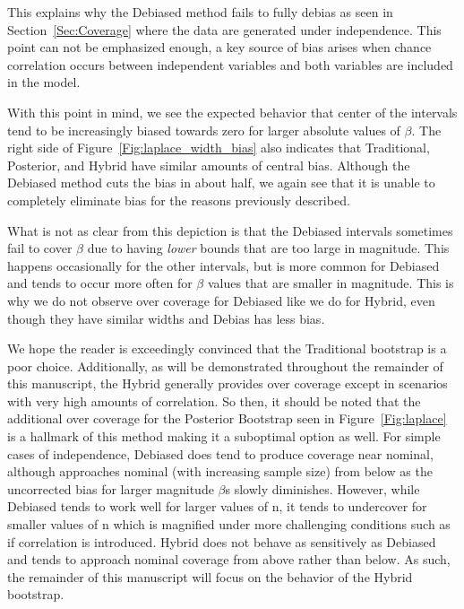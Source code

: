 This explains why the Debiased method fails to fully debias as seen in Section~\ref{Sec:Coverage} where the data are generated under independence. This point can not be emphasized enough, a key source of bias arises when chance correlation occurs between independent variables and both variables are included in the model.

With this point in mind, we see the expected behavior that center of the intervals tend to be increasingly biased towards zero for larger absolute values of $\beta$. The right side of Figure~\ref{Fig:laplace_width_bias} also indicates that Traditional, Posterior, and Hybrid have similar amounts of central bias. Although the Debiased method cuts the bias in about half, we again see that it is unable to completely eliminate bias for the reasons previously described.

What is not as clear from this depiction is that the Debiased intervals sometimes fail to cover $\beta$ due to having \textit{lower} bounds that are too large in magnitude. This happens occasionally for the other intervals, but is more common for Debiased and tends to occur more often for $\beta$ values that are smaller in magnitude. This is why we do not observe over coverage for Debiased like we do for Hybrid, even though they have similar widths and Debias has less bias. 

We hope the reader is exceedingly convinced that the Traditional bootstrap is a poor choice. Additionally, as will be demonstrated throughout the remainder of this manuscript, the Hybrid generally provides over coverage except in scenarios with very high amounts of correlation.  So then, it should be noted that the additional over coverage for the Posterior Bootstrap seen in Figure~\ref{Fig:laplace} is a hallmark of this method making it a suboptimal option as well. For simple cases of independence, Debiased does tend to produce coverage near nominal, although approaches nominal (with increasing sample size) from below as the uncorrected bias for larger magnitude $\beta$s slowly diminishes. However, while Debiased tends to work well for larger values of n, it tends to undercover for smaller values of n which is magnified under more challenging conditions such as if correlation is introduced. Hybrid does not behave as sensitively as Debiased and tends to approach nominal coverage from above rather than below. As such, the remainder of this manuscript will focus on the behavior of the Hybrid bootstrap.


